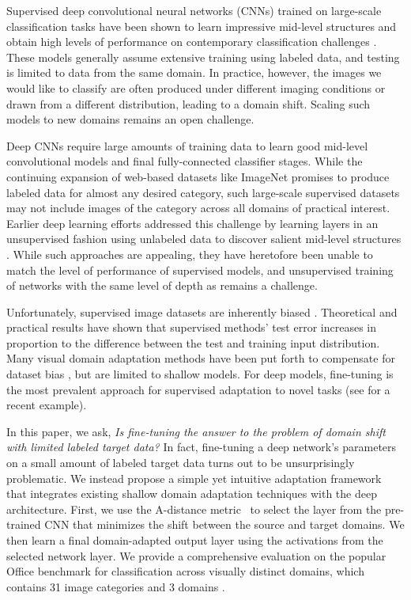
Supervised deep convolutional neural networks (CNNs) trained on large-scale
classification tasks have been shown to learn impressive mid-level structures
and obtain high levels of performance on contemporary classification
challenges \cite{ilsvrc2012,zeiler-arxiv-2013}. These models generally assume
extensive training using labeled data, and testing is limited to data from the
same domain. In practice, however, the images we would like to classify are
often produced under different imaging conditions or drawn from a different
distribution, leading to a domain shift. Scaling such models to new domains
remains an open challenge.

Deep CNNs require large amounts of training data to learn
good mid-level convolutional models and final fully-connected classifier
stages. While the continuing expansion of web-based datasets like
ImageNet \cite{ilsvrc2012} promises to produce labeled data for almost any desired
category, such large-scale supervised datasets
may not include images of the category across all
domains of practical interest. Earlier deep learning efforts addressed this
challenge by learning layers in an unsupervised fashion using unlabeled data to
discover salient mid-level structures \cite{coates-nips12, dean-nips12}. While such approaches are appealing, they
have heretofore been unable to match the level of performance of supervised
models, and unsupervised training of networks with the same level of depth
as \cite{supervision} remains a challenge.

 
Unfortunately, supervised image datasets are inherently biased \cite{efros-cvpr11}. 
Theoretical \cite{ben2007analysis, blitzer2007learning} and practical results \cite{saenko-eccv10,efros-cvpr11} have shown that supervised methods' test error increases in proportion to the difference between the test and training input distribution. 
Many visual domain adaptation methods have been put forth to compensate for dataset bias \cite{daume,yang-icdm07,aytar-iccv11,saenko-eccv10,kulis-cvpr11,Khosla-eccv12,gopalan-iccv11,gong-cvpr12,hoffman-eccv12,hoffman-iclr13}, but are limited to shallow models. For deep models, fine-tuning is the most prevalent approach for supervised adaptation to novel tasks (see \cite{rcnn} for a recent example). 

In this paper, we ask,
\textit{Is fine-tuning the answer to the problem of domain shift with limited labeled target data?}
In fact, fine-tuning a deep network's parameters on a small amount of labeled target data turns out to be unsurprisingly
problematic. We instead propose a simple yet intuitive adaptation framework that integrates existing shallow domain adaptation techniques with the deep architecture.
First, we use the A-distance metric~\cite{adist} to select the layer from the
pre-trained CNN that minimizes the shift between the source and target domains.  We then learn a final domain-adapted output layer using the activations
from the selected network layer.  
We provide a comprehensive evaluation on the popular Office benchmark for classification across visually distinct domains, which contains 31 image categories and 3 domains \cite{saenko-eccv10}. 

